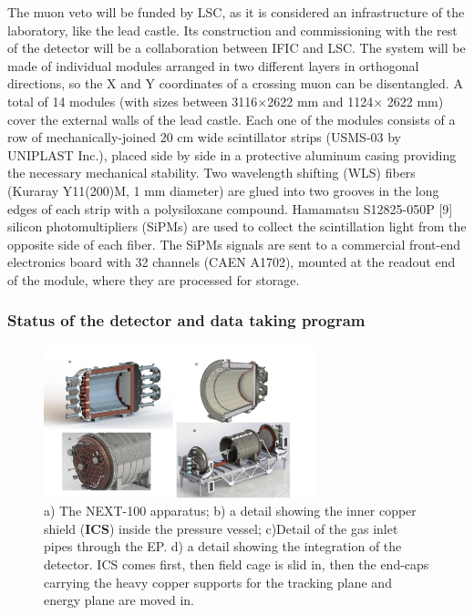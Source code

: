The muon veto will be funded by LSC, as it is considered an infrastructure of the laboratory, like the lead castle. Its construction and commissioning with the rest of the detector will be a collaboration between IFIC and LSC. The system will be made of individual modules arranged in two different layers in orthogonal directions, so the X and Y coordinates of a crossing muon can be disentangled. A total of 14 modules (with sizes between 3116$\times$2622 mm and 1124$\times$ 2622 mm) cover the external walls of the lead castle. Each one of the modules consists of a row of mechanically-joined 20 cm wide scintillator strips  (USMS-03 by UNIPLAST Inc.), placed side by side in a protective aluminum casing providing the necessary mechanical stability. Two wavelength shifting (WLS) fibers (Kuraray Y11(200)M, 1 mm diameter) are glued into two grooves in the long edges of each strip with a polysiloxane compound. Hamamatsu S12825-050P [9] silicon photomultipliers (SiPMs) are used to collect the scintillation light from the opposite side of each fiber. The SiPMs signals are sent to a commercial front-end electronics board with 32 channels (CAEN A1702), mounted at the readout end of the module, where  they are processed for storage.

\subsubsection{Status of the detector and data taking program}

\begin{figure}[!htb]
\centering
\includegraphics[width=0.7\textwidth]{img2/collage.pdf}
\caption{\small a) The NEXT-100 apparatus; b) a detail showing the inner copper shield ({\bf ICS}) inside the pressure vessel; c)Detail of the gas inlet pipes through the EP. d) a detail showing the integration of the detector. ICS comes first, then field cage is slid in, then the end-caps carrying the heavy copper supports for the tracking plane and energy plane are moved in.} 
\label{fig.n100e}
\end{figure} 


